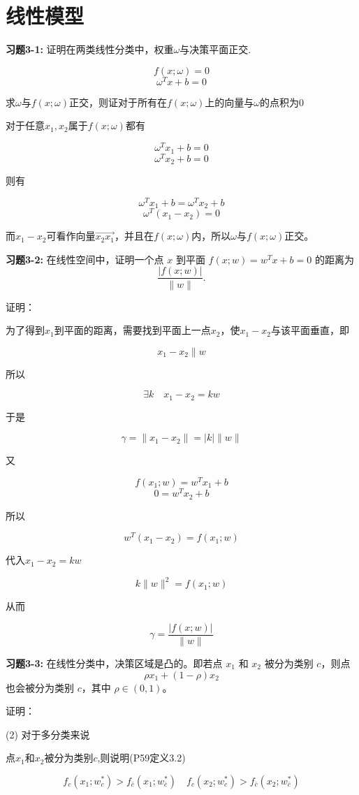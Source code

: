 \section{线性模型}

\noindent\textbf{习题3-1:} 证明在两类线性分类中，权重$\omega$与决策平面正交.

\[f(x; \omega) = 0\]
\[\omega^T x + b = 0\]

求$\omega$与$f(x;\omega)$正交，则证对于所有在$f(x;\omega)$上的向量与$\omega$的点积为0

对于任意$x_1,x_2$属于$f(x;\omega)$都有

\[\omega^T x_1 + b = 0\]
\[\omega^T x_2 + b = 0\]

则有

\[\omega^T x_1 + b = \omega^T x_2 + b\]
\[\omega^T(x_1 - x_2) = 0\]

而$x_1 - x_2$可看作向量$\overrightarrow{x_2x_1}$，并且在$f(x;\omega)$内，所以$\omega$与$f(x;\omega)$正交。


\noindent\textbf{习题3-2:} 在线性空间中，证明一个点 $x$ 到平面 $f(x;w) = w^Tx + b = 0$ 的距离为
\[
\frac{|f(x;w)|}{\|w\|}.
\]

证明：

为了得到$x_1$到平面的距离，需要找到平面上一点$x_2$，使$x_1 - x_2$与该平面垂直，即

\[x_1 - x_2 \parallel w\]

所以

\[\exists k \quad x_1 - x_2 = kw\]

于是

\[\gamma = \|x_1 - x_2\| = |k|\|w\|\]

又

\[f(x_1; w) = w^T x_1 + b\]
\[0 = w^T x_2 + b\]

所以

\[w^T(x_1 - x_2) = f(x_1; w)\]

代入$x_1 - x_2 = kw$

\[k\|w\|^2 = f(x_1; w)\]

从而

\[\gamma = \frac{|f(x; w)|}{\|w\|}\]


\noindent\textbf{习题3-3:} 在线性分类中，决策区域是凸的。即若点 $x_1$ 和 $x_2$ 被分为类别 $c$，则点
\[
\rho x_1 + (1-\rho)x_2
\]
也会被分为类别 $c$，其中 $\rho \in (0,1)$。

证明：

(2) 对于多分类来说

点$x_1$和$x_2$被分为类别$c$,则说明(P59定义3.2)

\[f_c(x_1; w_c^*) > f_{\bar{c}}(x_1; w_{\bar{c}}^*) \quad f_c(x_2; w_c^*) > f_{\bar{c}}(x_2; w_{\bar{c}}^*)\]

